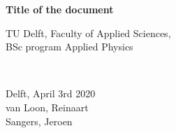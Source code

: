 \begin{titlepage}

\newcommand{\HRule}{\rule{\linewidth}{0.5mm}} %

\center


{ \huge \bfseries Title of the document}\\[1cm] %
 





\vfill
\begin{minipage}{0.4\textwidth}
    \begin{flushleft}
        TU Delft, Faculty of Applied Sciences,\\
        BSc program Applied Physics
    \end{flushleft}
\end{minipage}
~
\begin{minipage}{0.4\textwidth}
    \begin{flushright}
        Delft, April 3rd 2020\\
        van Loon, Reinaart\\
        Sangers, Jeroen
    \end{flushright}
\end{minipage}\\[1.5cm]


\end{titlepage}
